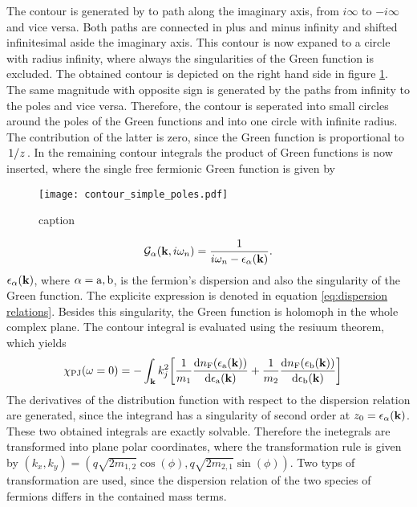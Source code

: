 The contour is generated by to path along the imaginary axis, from $i\infty$ to $-i\infty$ and vice versa.
Both paths are connected in plus and minus infinity and shifted infinitesimal aside the imaginary axis.
This contour is now expaned to a circle with radius infinity, where always the singularities of the Green function is excluded.
The obtained contour is depicted on the right hand side in figure \ref{fig:contour simple poles}.
The same magnitude with opposite sign is generated by the paths from infinity to the poles and vice versa.
Therefore, the contour is seperated into small circles around the poles of the Green functions and into one circle with infinite radius.
The contribution of the latter is zero, since the Green function is proportional to $\flatfrac{1}{z}$.
In the remaining contour integrals the product of Green functions is now inserted, where the single free fermionic Green function is given by
%
\begin{figure}[t]
	\centering
	\texttt{[image: contour\_simple\_poles.pdf]}
	\caption{caption}
	\label{fig:contour simple poles}
\end{figure}
%
%
\begin{align}
	\mathcal{G}_{\alpha}(\vb{k}, i\omega_{n}) = \frac{1}{i\omega_{n} - \epsilon_{\alpha}(\vb{k})}.
\end{align}
%
$\epsilon_{\alpha}(\vb{k})$, where $\alpha = \mathrm{a},\mathrm{b}$, is the fermion's dispersion and also the singularity of the Green function.
The explicite expression is denoted in equation \eqref{eq:dispersion relations}.
Besides this singularity, the Green function is holomoph in the whole complex plane.
The contour integral is evaluated using the resiuum theorem, which yields
%
\begin{align}
	\chi_{\mathrm{PJ}}(\omega = 0) &= 
		- \int_{\vb{k}} 
		k_{j}^{2}
		\bigg[
			\frac{1}{m_{1}}
			\dv{n_{\mathrm{F}}(\epsilon_{\mathrm{a}}(\vb{k}))}{\epsilon_{\mathrm{a}}(\vb{k})}
			+
			\frac{1}{m_{2}}
			\dv{n_{\mathrm{F}}(\epsilon_{\mathrm{b}}(\vb{k}))}{\epsilon_{\mathrm{b}}(\vb{k})}
		\bigg]
\end{align}
%
The derivatives of the distribution function with respect to the dispersion relation are generated, since the integrand has a singularity of second order at $z_{0} = \epsilon_{\alpha}(\vb{k})$.
These two obtained integrals are exactly solvable.
Therefore the inetegrals are transformed into plane polar coordinates, where the transformation rule is given by $(k_{x}, k_{y}) = (q\sqrt{2m_{1,2}}\cos(\phi), q\sqrt{2m_{2,1}}\sin(\phi))$.
Two typs of transformation are used, since the dispersion relation of the two species of fermions differs in the contained mass terms.

